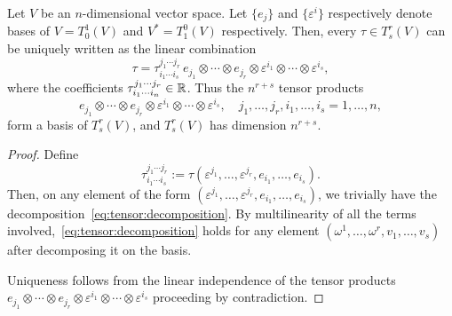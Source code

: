 \begin{proposition}\label{prop:tensorbasis}
	Let $V$ be an $n$-dimensional vector space.
	Let $\{e_j\}$ and $\{\varepsilon^i\}$ respectively denote bases of $V=T_0^1(V)$ and $V^*=T_1^0(V)$ respectively.
	Then, every $\tau\in T_s^r(V)$ can be uniquely written as the linear combination%
	\begin{equation}\label{eq:tensor:decomposition}
		\tau = \tau^{j_1\cdots j_r}_{i_1\cdots i_s} \, e_{j_1}\otimes\cdots\otimes e_{j_r}\otimes \varepsilon^{i_1}\otimes \cdots\otimes \varepsilon^{i_s},
	\end{equation}
	where the coefficients $\tau^{j_1\cdots j_r}_{i_1\cdots i_n}\in\mathbb{R}$.
	Thus the $n^{r+s}$ tensor products
	\begin{equation}\label{eq:tensor:decompo}
		e_{j_1}\otimes\cdots\otimes e_{j_r}\otimes \varepsilon^{i_1}\otimes \cdots\otimes \varepsilon^{i_s}, \quad j_1,\ldots,j_r, i_1,\ldots,i_s = 1,\ldots,n,
	\end{equation}
	form a basis of $T_s^r(V)$, and $T_s^r(V)$ has dimension $n^{r+s}$.
\end{proposition}

\begin{proof}
	Define
	\begin{equation}
		\tau^{j_1\cdots j_r}_{i_1\cdots i_s} := \tau(\varepsilon^{j_1}, \ldots, \varepsilon^{j_r}, e_{i_1}, \ldots, e_{i_s}).
	\end{equation}
	Then, on any element of the form $(\varepsilon^{j_1}, \ldots, \varepsilon^{j_r}, e_{i_1}, \ldots, e_{i_s})$, we trivially have the decomposition~\eqref{eq:tensor:decomposition}.
	By multilinearity of all the terms involved,~\eqref{eq:tensor:decomposition} holds for any element $(\omega^1, \ldots, \omega^r, v_1, \ldots, v_s)$ after decomposing it on the basis.

	Uniqueness follows from the linear independence of the tensor products $e_{j_1}\otimes\cdots\otimes e_{j_r}\otimes \varepsilon^{i_1}\otimes \cdots\otimes \varepsilon^{i_s}$ proceeding by contradiction.
\end{proof}

